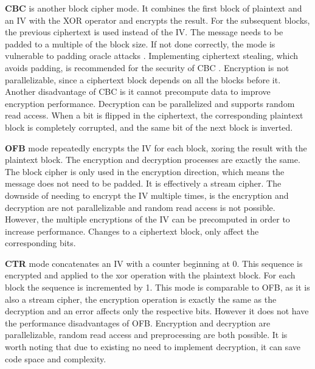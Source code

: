 \textbf{\ac{CBC}} is another block cipher mode. It combines the first block of plaintext and an \ac{IV} with the XOR operator and encrypts the result. For the subsequent blocks, the previous ciphertext is used instead of the IV. The message needs to be padded to a multiple of the block size. If not done correctly, the mode is vulnerable to padding oracle attacks \cite{paddingoracle}. Implementing ciphertext stealing, which avoids padding, is recommended for the security of \ac{CBC} \cite{ciphertextstealing}.
Encryption is not parallelizable, since a ciphertext block depends on all the blocks before it. Another disadvantage of \ac{CBC} is it cannot precompute data to improve encryption performance. Decryption can be parallelized and supports random read access.
When a bit is flipped in the ciphertext, the corresponding plaintext block is completely corrupted, and the same bit of the next block is inverted.

\textbf{\ac{OFB}} mode repeatedly encrypts the IV for each block, xoring the result with the plaintext block. The encryption and decryption processes are exactly the same.
The block cipher is only used in the encryption direction, which means the message does not need to be padded. It is effectively a stream cipher.
The downside of needing to encrypt the IV multiple times, is the encryption and decryption are not parallelizable and random read access is not possible. However, the multiple encryptions of the IV can be precomputed in order to increase performance.
Changes to a ciphertext block, only affect the corresponding bits.

%
\textbf{\ac{CTR}} mode concatenates an IV with a counter beginning at 0. This sequence is encrypted and applied to the xor operation with the plaintext block. For each block the sequence is incremented by 1.
This mode is comparable to \ac{OFB}, as it is also a stream cipher, the encryption operation is exactly the same as the decryption and an error affects only the respective bits.
However it does not have the performance disadvantages of \ac{OFB}. Encryption and decryption are parallelizable, random read access and preprocessing are both possible.
It is worth noting that due to existing no need to implement decryption, it can save code space and complexity.

